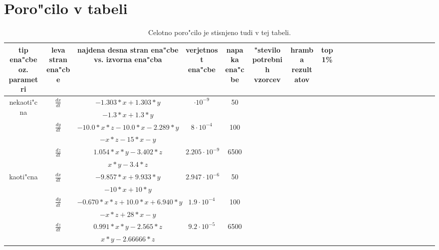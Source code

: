 \documentclass[10pt,a4paper]{article}
\begin{document}
\pagebreak
\section{Poro"cilo v tabeli}

\begin{table}
	\begin{tabular}{cc *{15}{c}ccccc}
		\multicolumn{1}{p{1cm}|}{tip ena"cbe oz. parametri} & 
		\multicolumn{1}{p{0.5cm}|}{leva stran ena"cbe} &
		 \multicolumn{1}{p{5cm}|}{najdena desna stran ena"cbe vs. izvorna ena"cba} &
		 \multicolumn{1}{p{1cm}|}{verjetnost ena"cbe} &
		  \multicolumn{1}{p{2cm}|}{napaka ena"cbe} &
		   \multicolumn{1}{p{1cm}|}{"stevilo potrebnih vzorcev} & 
		   \multicolumn{1}{p{1cm}|}{hramba rezultatov} & \multicolumn{1}{p{1cm}|}{top 1\%} \\
		   \hline
		\multirow{6}{1.5cm}{nekaoti"cna} & \multirow{2}{1.5cm}{$\frac{dx}{dt}$} & $ -1.303*x + 1.303*y $ & $\cdot 10^{-9}$ & 50 & &  \\
								 & & $ -1.3*x + 1.3*y $ & & & \\
								\cline{3-6}
		 & \multirow{2}{1.5cm}{$\frac{dy}{dt}$} & $-10.0*x*z - 10.0*x - 2.289*y$ & $8\cdot 10^{-4}$ & 100 &  \\
								 & & $ -x*z -15*x -y $ & & & \\
								\cline{3-6}
		& \multirow{2}{1.5cm}{$\frac{dz}{dt}$} & $1.054*x*y - 3.402*z$ & $2.205\cdot 10^{-9}$ & 6500 \\
								 & & $ x*y - 3.4*z $ & & & \\
		\hline
		\multirow{6}{1.5cm}{kaoti"cna} & \multirow{2}{1.5cm}{$\frac{dx}{dt}$} & $-9.857*x + 9.933*y$ & $2.947\cdot 10^{-6}$  & 50 \\
								 & & $ -10*x + 10*y $ & & & \\
								\cline{3-6}
		& \multirow{2}{1.5cm}{$\frac{dy}{dt}$} & $ -0.670*x*z + 10.0*x + 6.940*y $ & $ 1.9\cdot 10^ {-4}$ & 100 \\
								 & & $ -x*z + 28*x -y $ & & & \\
								\cline{3-6}
		& \multirow{2}{1.5cm}{$\frac{dz}{dt}$} & $0.991*x*y - 2.565*z$ & $9.2\cdot 10^ {-5}$ & 6500 \\
								 & & $ x*y - 2.66666*z $ & & & \\
	\end{tabular}
	 \caption{ Celotno poro"cilo je stisnjeno tudi v tej tabeli. }
\end{table}



\end{document}
